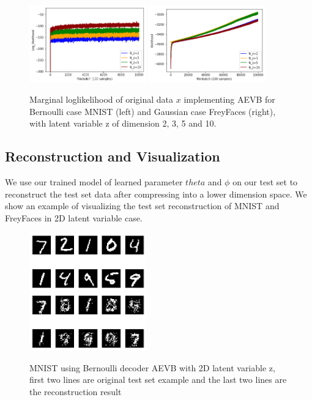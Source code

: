 \documentclass[11pt]{article}
\begin{document}
\begin{figure}[H]
\begin{center}
\includegraphics[width = 0.45\textwidth]{fig/Bernoulli_loglikelihood}
\includegraphics[width = 0.45\textwidth]{fig/gaussian-loglikelihood}
\caption{Marginal loglikelihood of original data $x$ implementing AEVB for Bernoulli case MNIST (left) and Gaussian case FreyFaces (right), with latent variable z of dimension 2, 3, 5 and 10. } \label{fig:VB-Likelihood}
\end{center}
\end{figure}


\subsection{Reconstruction and Visualization}
We use our trained model of learned parameter $theta$ and $\phi$ on our test set to reconstruct the test set data after compressing into a lower dimension space. We show an example of visualizing the test set reconstruction of MNIST and FreyFaces in 2D latent variable case. 

\begin{figure}[H]
\begin{center}
\includegraphics[width = 0.45\textwidth]{fig/Bernoulli_test}\\
\vspace{5mm}
\includegraphics[width = 0.45\textwidth]{fig/Bernoulli_new}
\caption{MNIST using Bernoulli decoder AEVB with 2D latent variable z, first two lines are original test set example and the last two lines are the reconstruction result} \label{fig:MNIST-reconst}
\end{center}
\end{figure}
\end{document}
